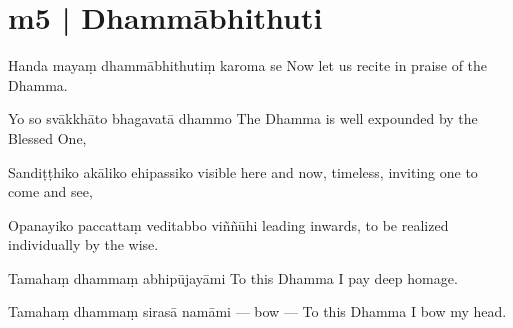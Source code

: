 \section*{m5 | Dhammābhithuti}

\begin{chantsubsection}
  \chantline
    {Handa mayaṃ dhammābhithutiṃ karoma se}
    {Now let us recite in praise of the Dhamma.}

  \chantline
    {Yo so svākkhāto bhagavatā dhammo}
    {The Dhamma is well expounded by the Blessed One,}

  \chantline
    {Sandiṭṭhiko akāliko ehipassiko}
    {visible here and now, timeless, inviting one to come and see,}

  \chantline
    {Opanayiko paccattaṃ veditabbo viññūhi}
    {leading inwards, to be realized individually by the wise.}

  \chantline
    {Tamahaṃ dhammaṃ abhipūjayāmi}
    {To this Dhamma I pay deep homage.}

  \chantline
    {Tamahaṃ dhammaṃ sirasā namāmi \;\;\; --- bow ---}
    {To this Dhamma I bow my head.}

\end{chantsubsection}
